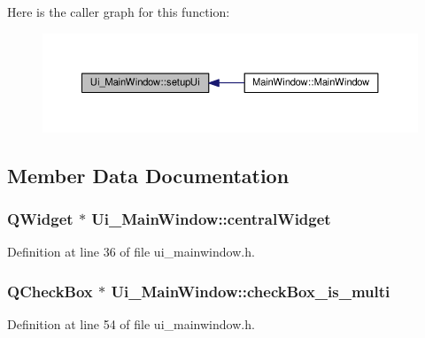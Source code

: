 Here is the caller graph for this function\+:
\nopagebreak
\begin{figure}[H]
\begin{center}
\leavevmode
\includegraphics[width=350pt]{class_ui___main_window_acf4a0872c4c77d8f43a2ec66ed849b58_icgraph}
\end{center}
\end{figure}




\subsection{Member Data Documentation}
\subsubsection[{\texorpdfstring{central\+Widget}{centralWidget}}]{\setlength{\rightskip}{0pt plus 5cm}Q\+Widget $\ast$ Ui\+\_\+\+Main\+Window\+::central\+Widget}\hypertarget{class_ui___main_window_a6600dd3bdd3d55e535659e4a4096ea48}{}\label{class_ui___main_window_a6600dd3bdd3d55e535659e4a4096ea48}


Definition at line 36 of file ui\+\_\+mainwindow.\+h.

\subsubsection[{\texorpdfstring{check\+Box\+\_\+is\+\_\+multi}{checkBox_is_multi}}]{\setlength{\rightskip}{0pt plus 5cm}Q\+Check\+Box $\ast$ Ui\+\_\+\+Main\+Window\+::check\+Box\+\_\+is\+\_\+multi}\hypertarget{class_ui___main_window_ae2abbaae1ca7973cea2517946b0d9c18}{}\label{class_ui___main_window_ae2abbaae1ca7973cea2517946b0d9c18}


Definition at line 54 of file ui\+\_\+mainwindow.\+h.

